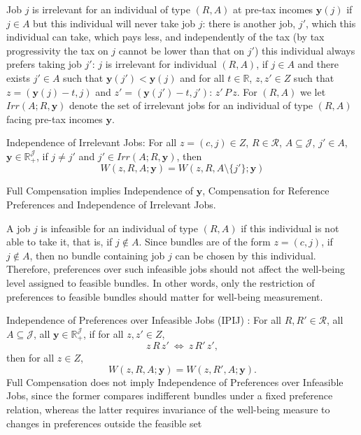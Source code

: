 \documentclass[12pt,thmsb]{article}
\begin{document}
Job $j$ is irrelevant for an individual of type $(R,A)$ at pre-tax incomes $\mathbf{y}(j)$ if $j\in A$ but this individual will never take job $j$: there is another job, $j'$, which this individual can take, which pays less, and independently of the tax (by tax progressivity the tax on $j$ cannot be lower than that on $j'$) this individual always prefers taking job $j'$: $j$ is irrelevant for individual $(R,A)$, if $j\in A$ and there exists $j'\in A$ such that $\mathbf{y}(j')<\mathbf{y}(j)$ and for all $t\in\mathbb{R}$, $z,z'\in Z$ such that $z=(\mathbf{y}(j)-t,j)$ and $z'=(\mathbf{y}(j')-t,j')$: $z'\,P\,z$. For $(R,A)$ we let $Irr(A;R,\mathbf{y})$ denote the set of irrelevant jobs for an individual of type $(R,A)$ facing pre-tax incomes $\mathbf{y}$.

Independence of Irrelevant Jobs: For all $z=(c,j)\in Z$, $R\in \mathcal{R}$, $A\subseteq \mathcal{J}$, $j'\in A$, $\mathbf{y} \in \mathbb{R}_{+}^{\mathcal{J}}$, if $j\neq j'$ and $j'\in Irr(A;R,\mathbf{y})$, then
\begin{equation*}
\label{ }
W(z,R,A;\mathbf{y})=W(z,R,A\setminus\{j'\};\mathbf{y})
\end{equation*}

Full Compensation implies Independence of $\mathbf{y}$, Compensation for Reference Preferences and Independence of Irrelevant Jobs.



A job $j$ is infeasible for an individual of type $(R,A)$ if this individual is not able to take it, that is, if $j\notin A$. Since bundles are of the form $z=(c,j)$, if $j\notin A$, then no bundle containing job $j$ can be chosen by this individual. Therefore, preferences over such infeasible jobs should not affect the well-being level assigned to feasible bundles. In other words, only the restriction of preferences to feasible bundles should matter for well-being measurement.

Independence of Preferences over Infeasible Jobs (IPIJ) : 
For all $R,R'\in\mathcal R$, all $A\subseteq \mathcal J$, all $\mathbf y\in\mathbb R_+^{\mathcal J}$, if for all $z,z'\in Z$,
\[
z\,R\,z' \ \Longleftrightarrow\ z\,R'\,z',
\]
then for all $z\in Z $,
\begin{equation*}
\label{}
W(z,R,A;\mathbf y)=W(z,R',A;\mathbf y).
\end{equation*}
Full Compensation does not imply Independence of Preferences over Infeasible Jobs, since the former compares indifferent bundles under a fixed preference relation, whereas the latter requires invariance of the well-being measure to changes in preferences outside the feasible set
\end{document}
